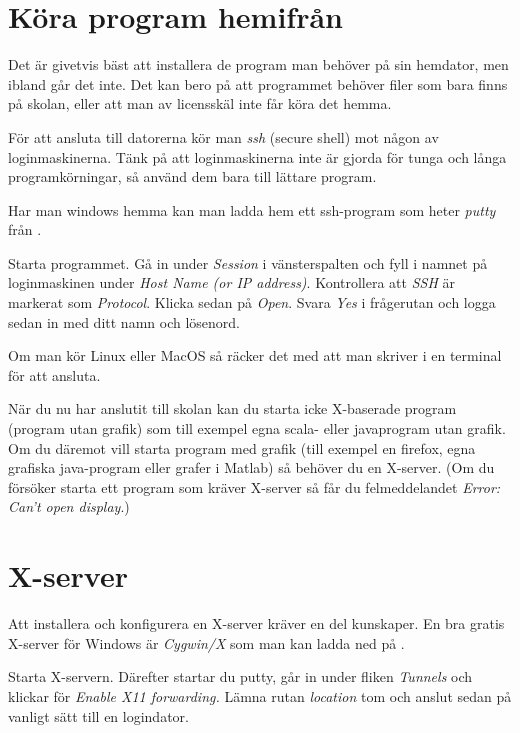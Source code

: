 \documentclass[a4paper,twocolumn]{book}
\begin{document}
\section{Köra program hemifrån}

Det är givetvis bäst att installera de program man behöver på sin hemdator,
men ibland går det inte. Det kan bero på att programmet behöver filer som bara
finns på skolan, eller att man av licensskäl inte får köra det hemma.

För att ansluta till datorerna kör man \emph{ssh} (secure shell) mot någon av
loginmaskinerna. Tänk på att loginmaskinerna inte är gjorda för tunga
och långa programkörningar, så använd dem bara till lättare program.

Har man windows hemma kan man ladda hem ett ssh-program som heter
\emph{putty} från .

Starta
programmet. Gå in under \emph{Session} i vänsterspalten och fyll i
namnet på loginmaskinen
under \emph{Host Name (or IP address)}. 
Kontrollera att \emph{SSH} är markerat som
\emph{Protocol}. Klicka
sedan på \emph{Open}. Svara \emph{Yes} i frågerutan och logga sedan in med
ditt namn och lösenord.

Om man kör Linux eller MacOS så räcker det med att man skriver 
 i en terminal för att ansluta.

När du nu har anslutit till skolan kan du starta icke X-baserade program
(program utan grafik) som till exempel egna scala- eller javaprogram
utan grafik. 
Om du däremot vill starta program med grafik (till exempel en firefox, egna 
grafiska java-program eller grafer i Matlab) så behöver du en X-server. 
(Om du försöker starta ett program som kräver X-server så får du 
felmeddelandet \emph{Error: Can't open display}.)


\section{X-server}

Att installera och konfigurera en X-server kräver en del kunskaper. En bra
gratis X-server för Windows är \emph{Cygwin/X} som man kan ladda ned på 
.

Starta X-servern. Därefter startar du putty, går in under fliken
\emph{Tunnels} och klickar för \emph{Enable X11 forwarding.} Lämna rutan
\emph{location} tom och anslut sedan på vanligt sätt till en logindator.
\end{document}
